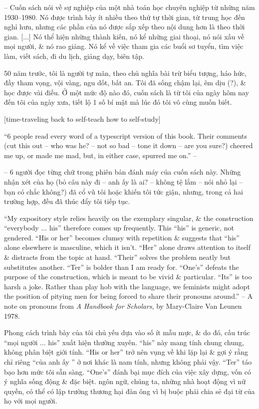 \documentclass{article}
\begin{document}
\begin{enumerate}
	-- Cuốn sách nói về sự nghiệp của một nhà toán học chuyên nghiệp từ những năm 1930--1980. Nó được trình bày ít nhiều theo thứ tự thời gian, từ trung học đến nghỉ hưu, nhưng các phần của nó được sắp xếp theo nội dung hơn là theo thời gian. [$\ldots$] Nó thể hiện những thành kiến, nó kể những giai thoại, nó nói xấu về mọi người, \& nó rao giảng. Nó kể về việc tham gia các buổi sơ tuyển, tìm việc làm, viết sách, đi du lịch, giảng dạy, biên tập.
	
	50 năm trước, tôi là người tự mãn, theo chủ nghĩa bài trừ biểu tượng, háo hức, đầy tham vọng, vội vàng, ngu dốt, bất an. Tôi đã sống chậm lại, êm dịu (?), \& học được vài điều. Ở một mức độ nào đó, cuốn sách là từ tôi của ngày hôm nay đến tôi của ngày xưa, tiết lộ 1 số bí mật mà lúc đó tôi vô cùng muốn biết. 
	
	[time-traveling back to self-teach how to self-study]
	
	``6 people read every word of a typescript version of this book. Their comments (cut this out -- who was he? -- not so bad -- tone it down -- are you sure?) cheered me up, or made me mad, but, in either case, spurred me on.'' -- \cite[Thanks]{Halmos1985}
	
	-- 6 người đọc từng chữ trong phiên bản đánh máy của cuốn sách này. Những nhận xét của họ (bỏ câu này đi -- anh ấy là ai? -- không tệ lắm -- nói nhỏ lại -- bạn có chắc không?) đã cổ vũ tôi hoặc khiến tôi tức giận, nhưng, trong cả hai trường hợp, đều đã thúc đẩy tôi tiếp tục.
	
	``My expository style relies heavily on the exemplary singular, \& the construction ``everybody $\ldots$ his'' therefore comes up frequently. This ``his'' is	generic, not gendered. ``His or her'' becomes clumsy with repetition \& suggests that ``his'' alone elsewhere is masculine, which it isn't. ``Her'' alone draws attention to itself \& distracts from the topic at hand. ``Their'' solves the problem neatly but substitutes another. ``Ter'' is bolder than I am ready for. ``One's'' defeats the purpose of the construction, which is meant to be vivid \& particular. ``Its'' is too harsh a joke. Rather than play hob with the language, we feminists might adopt the position of pitying men for being forced to share their pronouns around.'' -- A note on pronouns from {\it A Handbook for Scholars}, by {\sc Mary-Claire Van Leunen} 1978.
	
	Phong cách trình bày của tôi chủ yếu dựa vào số ít mẫu mực, \& do đó, cấu trúc ``mọi người $\ldots$ his'' xuất hiện thường xuyên. ``his'' này mang tính chung chung, không phân biệt giới tính. ``His or her'' trở nên vụng về khi lặp lại \& gợi ý rằng chỉ riêng ``của anh ấy '' ở nơi khác là nam tính, nhưng không phải vậy. ``Ter'' táo bạo hơn mức tôi sẵn sàng. ``One's'' đánh bại mục đích của việc xây dựng, vốn có ý nghĩa sống động \& đặc biệt. ngôn ngữ, chúng ta, những nhà hoạt động vì nữ quyền, có thể có lập trường thương hại đàn ông vì bị buộc phải chia sẻ đại từ của họ với mọi người.
	

\end{enumerate}
\end{document}
